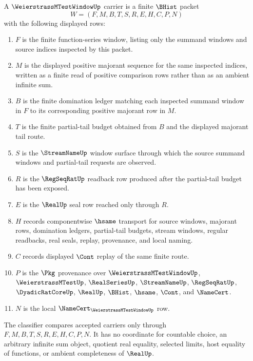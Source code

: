 \begin{definition}
\label{def:weierstrass-m-test-window-carrier}
A $\WeierstrassMTestWindowUp$ carrier is a finite $\BHist$ packet
$$
W=(F,M,B,T,S,R,E,H,C,P,N)
$$
with the following displayed rows:
\begin{enumerate}
\item $F$ is the finite function-series window, listing only the summand windows and source indices inspected by this packet.
\item $M$ is the displayed positive majorant sequence for the same inspected indices, written as a finite read of positive comparison rows rather than as an ambient infinite sum.
\item $B$ is the finite domination ledger matching each inspected summand window in $F$ to its corresponding positive majorant row in $M$.
\item $T$ is the finite partial-tail budget obtained from $B$ and the displayed majorant tail route.
\item $S$ is the $\StreamNameUp$ window surface through which the source summand windows and partial-tail requests are observed.
\item $R$ is the $\RegSeqRatUp$ readback row produced after the partial-tail budget has been exposed.
\item $E$ is the $\RealUp$ seal row reached only through $R$.
\item $H$ records componentwise $\hsame$ transport for source windows, majorant rows, domination ledgers, partial-tail budgets, stream windows, regular readbacks, real seals, replay, provenance, and local naming.
\item $C$ records displayed $\Cont$ replay of the same finite route.
\item $P$ is the $\Pkg$ provenance over $\WeierstrassMTestWindowUp$, $\WeierstrassMTestUp$, $\RealSeriesUp$, $\StreamNameUp$, $\RegSeqRatUp$, $\DyadicRatCoreUp$, $\RealUp$, $\BHist$, $\hsame$, $\Cont$, and $\NameCert$.
\item $N$ is the local $\NameCert_{\WeierstrassMTestWindowUp}$ row.
\end{enumerate}
The classifier compares accepted carriers only through $F,M,B,T,S,R,E,H,C,P,N$. It has no coordinate for countable choice, an arbitrary infinite sum object, quotient real equality, selected limits, host equality of functions, or ambient completeness of $\RealUp$.
\end{definition}

